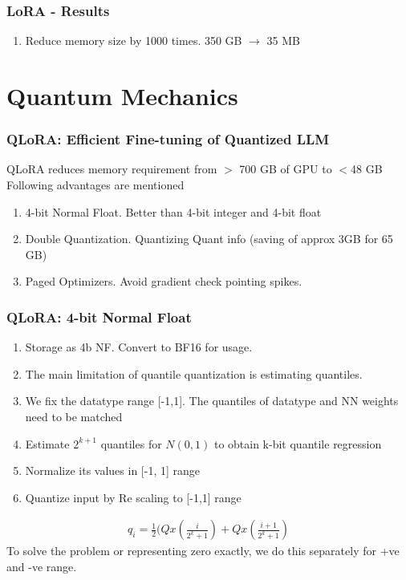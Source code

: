 \documentclass{beamer}
\theoremstyle{plain}
\theoremstyle{definition}
\theoremstyle{remark}
\numberwithin{equation}{section}
\numberwithin{figure}{section}
\numberwithin{theorem}{section}
\renewcommand{\to}{\longrightarrow}
\begin{document}
		\begin{frame}
			\frametitle{LoRA - Results}
			\begin{enumerate}
				\item Reduce memory size by 1000 times. 350 GB $\to$ 35 MB
			\end{enumerate}
		\end{frame}
		
		
		
		
		\section{Quantum Mechanics}
		\begin{frame}
			\frametitle{QLoRA: Efficient Fine-tuning of Quantized LLM}
			QLoRA reduces memory requirement from $>$ 700 GB of GPU to $<$48 GB
			Following advantages are mentioned
			\begin{enumerate}
				\item 4-bit Normal Float. Better than 4-bit integer and 4-bit float
				\item Double Quantization. Quantizing Quant info (saving of approx 3GB for 65 GB)
				\item Paged Optimizers. Avoid gradient check pointing spikes.
			\end{enumerate}
		\end{frame}
		
		\begin{frame}[shrink]
			\frametitle{QLoRA: 4-bit Normal Float}
			\begin{enumerate}
				\item Storage as 4b NF. Convert to BF16 for usage.
				\item The main limitation of quantile quantization is estimating quantiles.
				\item We fix the datatype range [-1,1]. The quantiles of datatype and NN weights need to be matched
				\item Estimate $2^{k+1}$ quantiles for $N(0,1)$ to obtain k-bit quantile regression
				\item Normalize its values in [-1, 1] range
				\item Quantize input by Re scaling to [-1,1] range
			\end{enumerate}                        
			
			\begin{align}
				q_i = \frac{1}{2} (Qx(\frac{i}{2^k+1}) + Qx(\frac{i+1}{2^k+1})    
			\end{align}
			To solve the problem or representing zero exactly, we do this separately for +ve and -ve range.
		\end{frame}                        
		
\end{document}
